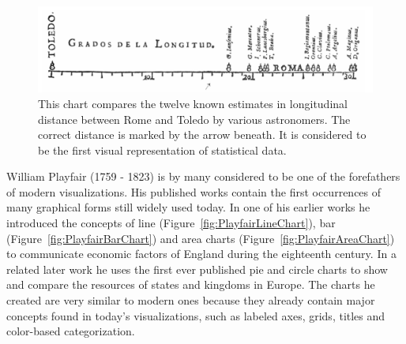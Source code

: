 \begin{figure}[tp]
\centering
\includegraphics[keepaspectratio,width=\linewidth,height=\fullh / 3]{images/rome-toledo-longitude.png}
\caption[Chart of Longitudinal Distance Determinations Between Toledo and Rome From 1644]{
  This chart compares the twelve known estimates in longitudinal distance between Rome and Toledo by various astronomers.
  The correct distance is marked by the arrow beneath.
  It is considered to be the first visual representation of statistical data.
}
\label{fig:RomeToledoLongitude}
\end{figure}

William Playfair (1759 - 1823) is by many considered to be one of the forefathers of modern visualizations.
His published works contain the first occurrences of many graphical forms still widely used today.
In one of his earlier works \parencite{CommercialAndPoliticalAtlas} he introduced the concepts of line (Figure~\ref{fig:PlayfairLineChart}), bar (Figure~\ref{fig:PlayfairBarChart}) and area charts (Figure~\ref{fig:PlayfairAreaChart}) to communicate economic factors of England during the eighteenth century.
In a related later work \parencite{StatisticalBreviary} he uses the first ever published pie and circle charts to show and compare the resources of states and kingdoms in Europe.
The charts he created are very similar to modern ones because they already contain major concepts found in today's visualizations, such as labeled axes, grids, titles and color-based categorization.

